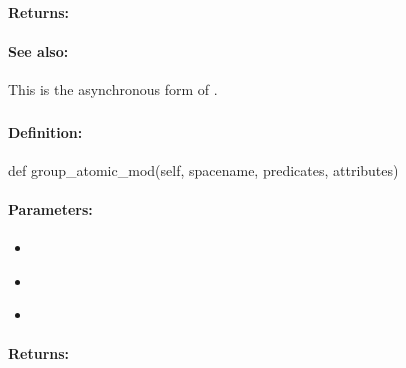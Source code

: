 \paragraph{Returns:}


\paragraph{See also:}  This is the asynchronous form of .

\pagebreak
\subsubsection{}
\label{api:python:group_atomic_mod}


\paragraph{Definition:}
\begin{pythoncode}
def group_atomic_mod(self, spacename, predicates, attributes)
\end{pythoncode}

\paragraph{Parameters:}
\begin{itemize}[noitemsep]
\item {}\\

\item {}\\

\item {}\\

\end{itemize}

\paragraph{Returns:}


\pagebreak
\subsubsection{}
\label{api:python:async_group_atomic_mod}


